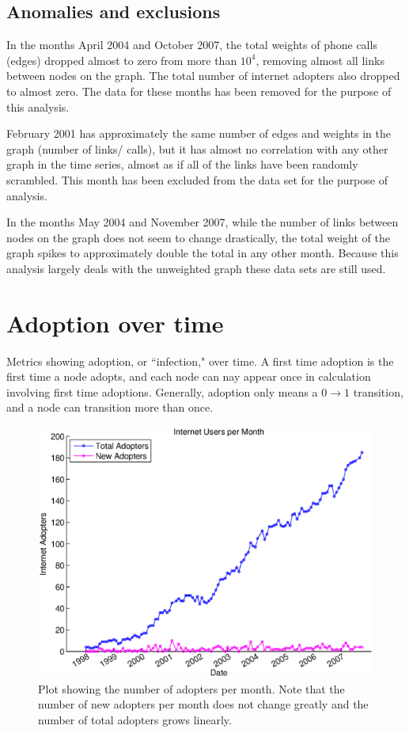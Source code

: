 \documentclass[12pt]{article}
\begin{document}
\subsection{Anomalies and exclusions}
In the months April 2004 and October 2007, the total weights of phone calls (edges) dropped almost to zero from more than \(10^4\), removing almost all links between nodes on the graph. The total number of internet adopters also dropped to almost zero. The data for these months has been removed for the purpose of this analysis.

February 2001 has approximately the same number of edges and weights in the graph (number of links/ calls), but it has almost no correlation with any other graph in the time series, almost as if all of the links have been randomly scrambled. This month has been excluded from the data set for the purpose of analysis.

In the months May 2004 and November 2007, while the number of links between nodes on the graph does not seem to change drastically, the total weight of the graph spikes to approximately double the total in any other month. Because this analysis largely deals with the unweighted graph these data sets are still used.

\section{Adoption over time}

Metrics showing adoption, or ``infection," over time. A first time adoption is the first time a node adopts, and each node can nay appear once in calculation involving first time adoptions. Generally, adoption only means a \(0 \rightarrow 1\) transition, and a node can transition more than once.

\begin{figure}[H]
\centering
\includegraphics[width = .7\textwidth]{Graficos/AdoptersperMonth.eps}
\caption{Plot showing the number of adopters per month. Note that the number of new adopters per month does not change greatly and the number of total adopters grows linearly.}
\label{fig:AdoptersperMonth}
\end{figure}
\end{document}
